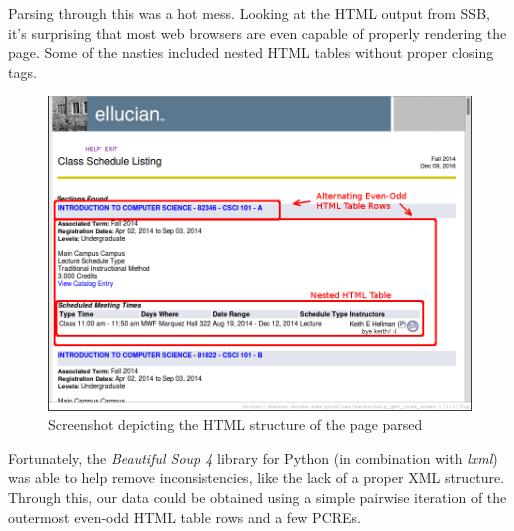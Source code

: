 \documentclass[12pt,letterpaper,titlepage]{article}
\begin{document}
Parsing through this was a hot mess. Looking at the HTML output from SSB, it's
surprising that most web browsers are even capable of properly rendering the
page. Some of the nasties included nested HTML tables without proper closing
tags.

\begin{figure}[H]
    \centering
    \includegraphics[width=0.8\linewidth]{bannertbl.png}
    \caption{Screenshot depicting the HTML structure of the page parsed}
\end{figure}

Fortunately, the \emph{Beautiful Soup 4} library for Python (in combination
with \emph{lxml}) was able to help remove inconsistencies, like the lack of a
proper XML structure. Through this, our data could be obtained using a simple
pairwise iteration of the outermost even-odd HTML table rows and a few PCREs.
\end{document}
